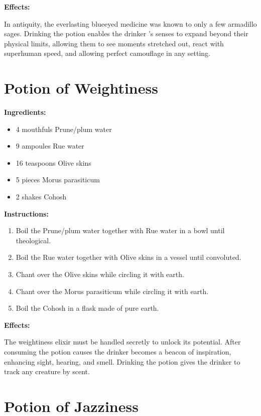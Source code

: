 \documentclass{article}
\begin{document}
\textbf{Effects:}

In antiquity, the everlasting blueeyed medicine was known to only a few armadillo sages. Drinking the potion enables the drinker 's senses to expand beyond their physical limits, allowing them to see moments stretched out, react with superhuman speed, and allowing perfect camouflage in any setting.

\newpage
\section*{Potion of Weightiness}

\textbf{Ingredients:}

\begin{itemize}
  \item 4 mouthfuls Prune/plum water
  \item 9 ampoules Rue water
  \item 16 teaspoons Olive skins
  \item 5 pieces Morus parasiticum
  \item 2 shakes Cohosh
\end{itemize}

\textbf{Instructions:}

\begin{enumerate}
  \item Boil the Prune/plum water together with Rue water in a bowl until theological.
  \item Boil the Rue water together with Olive skins in a vessel until convoluted.
  \item Chant over the Olive skins while circling it with earth.
  \item Chant over the Morus parasiticum while circling it with earth.
  \item Boil the Cohosh in a flask made of pure earth.
\end{enumerate}

\textbf{Effects:}

The weightiness elixir must be handled secretly to unlock its potential. After consuming the potion causes the drinker becomes a beacon of inspiration, enhancing sight, hearing, and smell. Drinking the potion gives the drinker to track any creature by scent.

\newpage
\section*{Potion of Jazziness}
\end{document}
